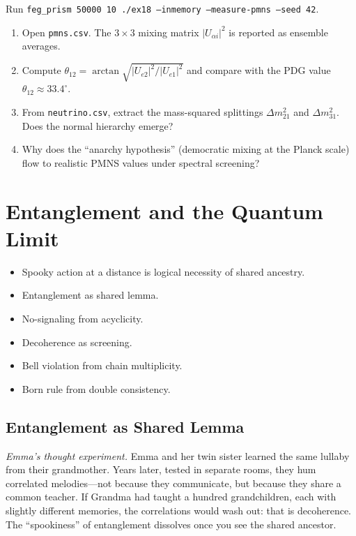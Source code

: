 \documentclass[11pt, a4paper, openany]{book}
\newenvironment{introduction}[1][Modulo Overview]{%
  \begin{tcolorbox}[
    enhanced,colback=structure!5,colframe=structure,
    colbacktitle=structure,coltitle=white,
    fonttitle=\small\bfseries,title={#1},
    arc=2pt,boxrule=0.7pt,
    left=8pt,right=8pt,top=6pt,bottom=6pt,
    before skip=12pt,after skip=12pt
  ]\itshape\begin{itemize}[leftmargin=*,itemsep=2pt,parsep=0pt]
}{%
  \end{itemize}\end{tcolorbox}
}
\begin{document}
\begin{simulation}
Run \texttt{feg\_prism 50000 10 ./ex18 --inmemory --measure-pmns --seed 42}.
\begin{enumerate}
\item Open \texttt{pmns.csv}. The $3 \times 3$ mixing matrix $|U_{\alpha i}|^2$ is reported as ensemble averages.
\item Compute $\theta_{12} = \arctan\sqrt{|U_{e2}|^2/|U_{e1}|^2}$ and compare with the PDG value $\theta_{12} \approx 33.4^\circ$.
\item From \texttt{neutrino.csv}, extract the mass-squared splittings $\Delta m^2_{21}$ and $\Delta m^2_{31}$. Does the normal hierarchy emerge?
\item Why does the ``anarchy hypothesis'' (democratic mixing at the Planck scale) flow to realistic PMNS values under spectral screening?
\end{enumerate}
\end{simulation}


\chapter{Entanglement and the Quantum Limit}\label{ch:entanglement}

\begin{introduction}
  \item Spooky action at a distance is logical necessity of shared ancestry.
  \item Entanglement as shared lemma.
  \item No-signaling from acyclicity.
  \item Decoherence as screening.
  \item Bell violation from chain multiplicity.
  \item Born rule from double consistency.
\end{introduction}

\section{Entanglement as Shared Lemma}\label{sec:entanglement}

\smallskip\noindent
\textit{Emma's thought experiment.}
Emma and her twin sister learned the same lullaby from their grandmother.
Years later, tested in separate rooms, they hum correlated melodies---not
because they communicate, but because they share a common teacher. If
Grandma had taught a hundred grandchildren, each with slightly different
memories, the correlations would wash out: that is decoherence. The
``spookiness'' of entanglement dissolves once you see the shared ancestor.
\smallskip
\end{document}
